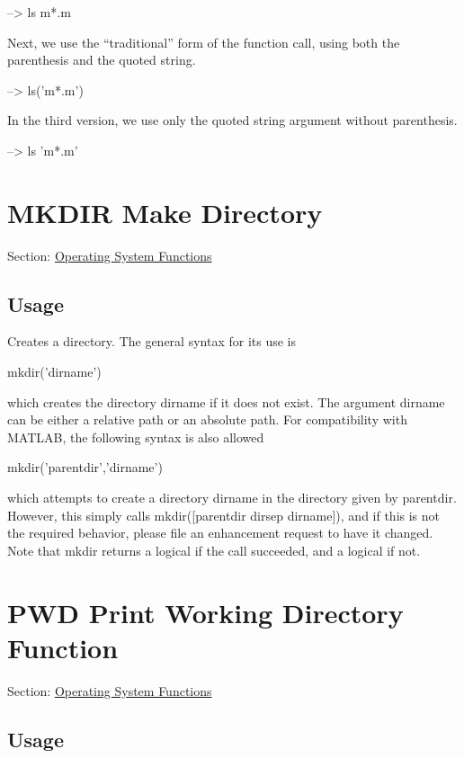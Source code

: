 \begin{DoxyVerbInclude}
--> ls m*.m
\end{DoxyVerbInclude}


Next, we use the ``traditional'' form of the function call, using both the parenthesis and the quoted string.


\begin{DoxyVerbInclude}
--> ls('m*.m')
\end{DoxyVerbInclude}


In the third version, we use only the quoted string argument without parenthesis.


\begin{DoxyVerbInclude}
--> ls 'm*.m'
\end{DoxyVerbInclude}
 \hypertarget{os_mkdir}{}\section{M\-K\-D\-I\-R Make Directory}\label{os_mkdir}
Section\-: \hyperlink{sec_os}{Operating System Functions} \hypertarget{vtkwidgets_vtkxyplotwidget_Usage}{}\subsection{Usage}\label{vtkwidgets_vtkxyplotwidget_Usage}
Creates a directory. The general syntax for its use is \begin{DoxyVerb}  mkdir('dirname')
\end{DoxyVerb}
 which creates the directory {\ttfamily dirname} if it does not exist. The argument {\ttfamily dirname} can be either a relative path or an absolute path. For compatibility with M\-A\-T\-L\-A\-B, the following syntax is also allowed \begin{DoxyVerb}  mkdir('parentdir','dirname')
\end{DoxyVerb}
 which attempts to create a directory {\ttfamily dirname} in the directory given by {\ttfamily parentdir}. However, this simply calls {\ttfamily mkdir(\mbox{[}parentdir dirsep dirname\mbox{]})}, and if this is not the required behavior, please file an enhancement request to have it changed. Note that {\ttfamily mkdir} returns a logical {} if the call succeeded, and a logical {} if not. \hypertarget{os_pwd}{}\section{P\-W\-D Print Working Directory Function}\label{os_pwd}
Section\-: \hyperlink{sec_os}{Operating System Functions} \hypertarget{vtkwidgets_vtkxyplotwidget_Usage}{}\subsection{Usage}\label{vtkwidgets_vtkxyplotwidget_Usage}
